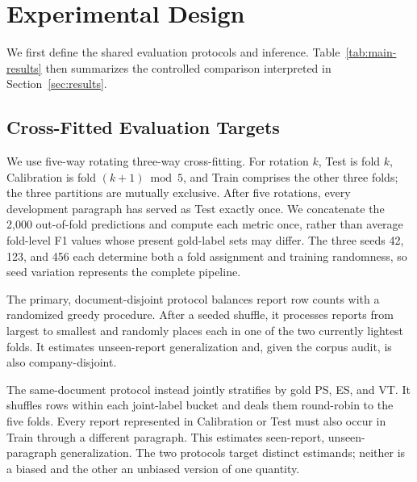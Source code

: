 \section{Experimental Design}
\label{sec:experiments}

We first define the shared evaluation protocols and inference. Table~\ref{tab:main-results}
then summarizes the controlled comparison interpreted in
Section~\ref{sec:results}.

\begin{table}[t]
  \centering
  \small
  \caption{Document-disjoint cross-fitted results on the Chinese development set.}
  \label{tab:main-results}
  \begingroup
  \setlength{\tabcolsep}{4pt}
  
  \endgroup
\end{table}

\subsection{Cross-Fitted Evaluation Targets}
We use five-way rotating three-way cross-fitting. For rotation $k$, Test is
fold $k$, Calibration is fold $(k+1)\bmod 5$, and Train comprises the other
three folds; the three partitions are mutually exclusive. After five
rotations, every development paragraph has served as Test exactly once. We
concatenate the 2,000 out-of-fold predictions and compute each metric once,
rather than average fold-level F1 values whose present gold-label sets may
differ. The three seeds 42, 123, and 456 each determine both a fold assignment
and training randomness, so seed variation represents the complete pipeline.

The primary, document-disjoint protocol balances report row counts with a
randomized greedy procedure. After a seeded shuffle, it processes reports from
largest to smallest and randomly places each in one of the two currently
lightest folds. It estimates unseen-report generalization and, given the corpus
audit, is also company-disjoint.

The same-document protocol instead jointly stratifies by gold PS, ES, and VT.
It shuffles rows within each joint-label bucket and deals them round-robin to
the five folds. Every report represented in Calibration or Test must also occur
in Train through a different paragraph. This estimates seen-report,
unseen-paragraph generalization. The two protocols target distinct estimands;
neither is a biased and the other an unbiased version of one quantity.

